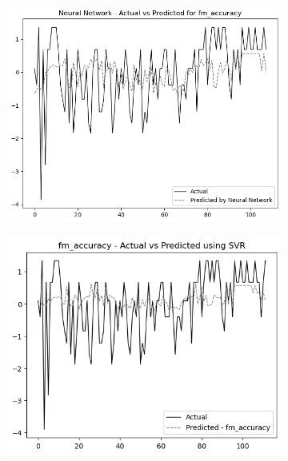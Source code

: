 \begin{figure}
    \begin{subfigure}[b]{0.49\textwidth}
        \centering
        \includegraphics[width=\linewidth]{images/nnCharts/all_data_fine_motor_accuracy.png}
    \end{subfigure}\hfill
    \begin{subfigure}[b]{0.49\textwidth}
        \centering
        \includegraphics[width=\linewidth]{images/regressionCharts/all_data_fine_motor_accuracy.png}
    \end{subfigure}
    

\end{figure}
